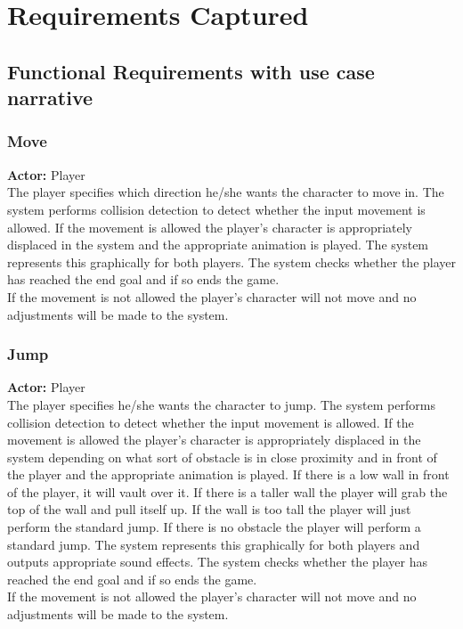 \documentclass[11pt,a4paper]{article}
\begin{document}
\section{Requirements Captured}
\subsection{Functional Requirements with use case narrative}
\subsubsection{Move}
\textbf{Actor:} Player\smallskip\\
The player specifies which direction he/she wants the character to move in. The system performs collision detection to detect whether the input movement is allowed. If the movement is allowed the player's character is appropriately displaced in the system and the appropriate animation is played. The system represents this graphically for both players. The system checks whether the player has reached the end goal and if so ends the game.\smallskip\\
If the movement is not allowed the player's character will not move and no adjustments will be made to the system.

\subsubsection{Jump}
\textbf{Actor:} Player\smallskip\\
The player specifies he/she wants the character to jump. The system performs collision detection to detect whether the input movement is allowed. If the movement is allowed the player's character is appropriately displaced in the system depending on what sort of obstacle is in close proximity and in front of the player and the appropriate animation is played. If there is a low wall in front of the player, it will vault over it. If there is a taller wall the player will grab the top of the wall and pull itself up. If the wall is too tall the player will just perform the standard jump. If there is no obstacle the player will perform a standard jump. The system represents this graphically for both players and outputs appropriate sound effects. The system checks whether the player has reached the end goal and if so ends the game.\smallskip\\
If the movement is not allowed the player's character will not move and no adjustments will be made to the system.
\end{document}
